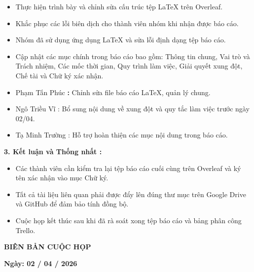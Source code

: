 \documentclass[12pt,a4paper]{article}
\begin{document}
\begin{itemize}
    \item Thực hiện trình bày và chỉnh sửa cấu trúc tệp LaTeX trên Overleaf.
    \item Khắc phục các lỗi biên dịch cho thành viên nhóm khi nhận được báo cáo.
    \item Nhóm đã sử dụng ứng dụng LaTeX và sửa lỗi định dạng tệp báo cáo.
    \item Cập nhật các mục chính trong báo cáo bao gồm: Thông tin chung, Vai trò
          và Trách nhiệm, Các mốc thời gian, Quy trình làm việc, Giải quyết xung đột,
          Chế tài và Chữ ký xác nhận.
\end{itemize}

\begin{itemize}[leftmargin=3.3em]
    \item[o] Phạm Tấn Phúc \textbf{:} Chỉnh sửa file báo cáo LaTeX, quản lý chung.
    \item[o] Ngô Triều Vĩ : Bổ sung nội dung về xung đột và quy tắc làm việc trước ngày 02/04.
    \item[o] Tạ Minh Trường :  Hỗ trợ hoàn thiện các mục nội dung trong báo cáo.
\end{itemize}

\vspace{2pt}
\textbf{3. Kết luận và Thống nhất :}
\begin{itemize}
    \item Các thành viên cần kiểm tra lại tệp báo cáo cuối cùng trên Overleaf
          và ký tên xác nhận vào mục Chữ ký.
    \item Tất cả tài liệu liên quan phải được đẩy lên đúng thư mục trên Google
          Drive và GitHub để đảm bảo tính đồng bộ.
    \item Cuộc họp kết thúc sau khi đã rà soát xong tệp báo cáo và bảng phân công Trello.
\end{itemize}

\newpage

\begin{center}
    {\large\bfseries BIÊN BẢN CUỘC HỌP}
\end{center}
\begin{center}
    \textbf{Ngày: 02 / 04 / 2026}
\end{center}
\vspace{0.4em}
\end{document}

